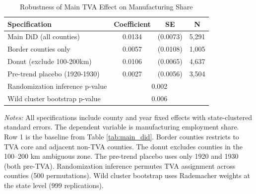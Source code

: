 \begin{table}[htbp]
\centering
\caption{Robustness of Main TVA Effect on Manufacturing Share}
\label{tab:robustness}
\begin{tabular}{lccc}
\toprule
Specification & Coefficient & SE & N \\
\midrule
Main DiD (all counties) & 0.0134 & (0.0073) & 5,291 \\
Border counties only & 0.0057 & (0.0108) & 1,005 \\
Donut (exclude 100-200km) & 0.0106 & (0.0065) & 4,637 \\
Pre-trend placebo (1920-1930) & 0.0027 & (0.0056) & 3,504 \\
\midrule
Randomization inference p-value & \multicolumn{3}{c}{0.002} \\
Wild cluster bootstrap p-value & \multicolumn{3}{c}{0.006} \\
\bottomrule
\end{tabular}
\begin{minipage}{0.95\textwidth}
\vspace{0.5em}
\footnotesize
\textit{Notes:} All specifications include county and year fixed effects with state-clustered standard errors. The dependent variable is manufacturing employment share. Row 1 is the baseline from Table \ref{tab:main_did}. Border counties restricts to TVA core and adjacent non-TVA counties. The donut excludes counties in the 100--200 km ambiguous zone. The pre-trend placebo uses only 1920 and 1930 (both pre-TVA). Randomization inference permutes TVA assignment across counties (500 permutations). Wild cluster bootstrap uses Rademacher weights at the state level (999 replications).
\end{minipage}
\end{table}
